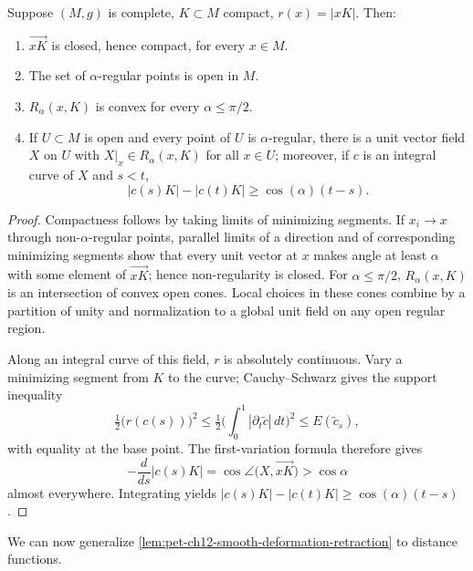 \begin{proposition}
  \label{prop:pet-ch12-regular-point-properties}

  Suppose $(M,g)$ is complete, $K\subset M$ compact, $r(x)=|xK|$. Then:
  \begin{enumerate}
    \item $\overrightarrow{xK}$ is closed, hence compact, for every $x\in M$.
    \item The set of $\alpha$-regular points is open in $M$.
    \item $R_\alpha(x,K)$ is convex for every $\alpha\le\pi/2$.
    \item If $U\subset M$ is open and every point of $U$ is $\alpha$-regular,
      there is a unit vector field $X$ on $U$ with $X|_x\in R_\alpha(x,K)$ for
      all $x\in U$; moreover, if $c$ is an integral curve of $X$ and $s<t$,
      \[
        |c(s)K|-|c(t)K|\ge\cos(\alpha)(t-s).
      \]
  \end{enumerate}
\end{proposition}
\begin{proof}
  \sketch
  Compactness follows by taking limits of minimizing segments. If
  $x_i\to x$ through non-$\alpha$-regular points, parallel limits of a
  direction and of corresponding minimizing segments show that every unit
  vector at $x$ makes angle at least $\alpha$ with some element of
  $\overrightarrow{xK}$; hence non-regularity is closed. For
  $\alpha\le\pi/2$, $R_\alpha(x,K)$ is an intersection of convex open cones.
  Local choices in these cones combine by a partition of unity and
  normalization to a global unit field on any open regular region.

  Along an integral curve of this field, $r$ is absolutely continuous. Vary a
  minimizing segment from $K$ to the curve; Cauchy--Schwarz gives the support
  inequality
  \[
    \tfrac12\big(r(c(s))\big)^2
    \le\tfrac12\Big(\int_0^1|\partial_t\tilde c|\,dt\Big)^2
    \le E(\tilde c_s),
  \]
  with equality at the base point. The first-variation formula therefore gives
  \[
    -\frac{d}{ds}|c(s)K|=
    \cos\angle\bigl(X,\overrightarrow{xK}\bigr)>\cos\alpha
  \]
  almost everywhere. Integrating yields
  $|c(s)K|-|c(t)K|\ge\cos(\alpha)(t-s)$.
\end{proof}

We can now generalize \cref{lem:pet-ch12-smooth-deformation-retraction} to
distance functions.

